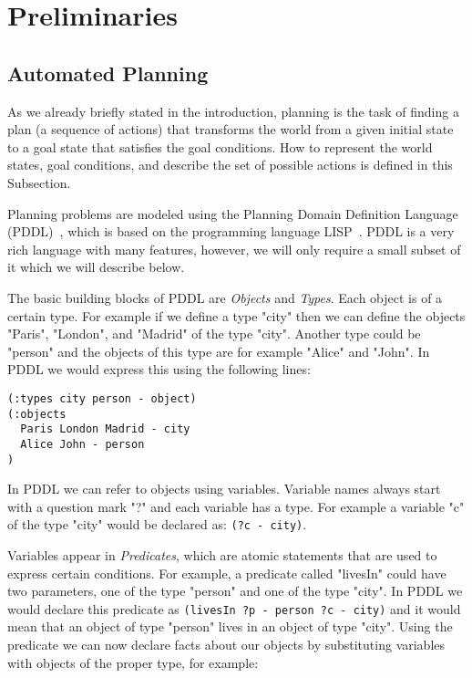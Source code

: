 \documentclass[runningheads]{llncs}
\begin{document}
\section{Preliminaries}

\subsection{Automated Planning}
As we already briefly stated in the introduction, planning is the task of finding a plan (a sequence of
actions) that transforms the world from a given initial state to a goal state that satisfies the
goal conditions. How to represent the world states, goal conditions, and describe the set of possible actions is
defined in this Subsection.

Planning problems are modeled using the Planning Domain Definition Language (PDDL)~\cite{haslumIntroductionPlanningDomain2019a}, which is
based on the programming language LISP~\cite{lisp86}. PDDL is a very rich language with many features, however, we
will only require a small subset of it which we will describe below.

The basic building blocks of PDDL are \emph{Objects} and \emph{Types}. Each object is of a certain
type. For example if we define a type "city" then we can define the objects "Paris", "London", and "Madrid" of
the type "city". Another type could be "person" and the objects of this type are for example "Alice" and "John".
In PDDL we would express this using the following lines:

\begin{verbatim}
(:types city person - object)
(:objects
  Paris London Madrid - city
  Alice John - person
)
\end{verbatim}

In PDDL we can refer to objects using variables. Variable names always start with a question mark "?" and each
variable has a type. For example a variable "c" of the type "city" would be declared as: \verb _(?c - city)_.

Variables appear in \emph{Predicates}, which are atomic statements that are used to express certain
conditions. For example, a predicate called "livesIn" could have two parameters, one of the type "person"
and one of the type "city". In PDDL we would declare this predicate as \verb _(livesIn ?p - person ?c - city)_
and it would mean that an object of type "person" lives in an object of type "city". Using the predicate
we can now declare facts about our objects by substituting variables with objects of the proper type, for example:
\end{document}
